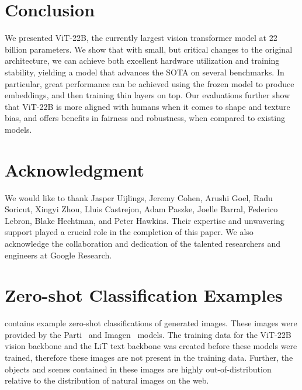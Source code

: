 \documentclass{article}
\newcommand{\chonk}{\mbox{ViT-22B}\xspace}
\begin{document}
\section{Conclusion}
\label{sec:conclusion}
We presented \chonk, the currently largest  vision transformer model at 22 billion parameters.
We show that with small, but critical changes to the original architecture, we can achieve both excellent hardware utilization and training stability, yielding a model that advances the SOTA on several benchmarks.
In particular, great performance can be achieved using the frozen model to produce embeddings, and then training thin layers on top.
Our evaluations further show that \chonk is more aligned with humans when it comes to shape and texture bias, and offers benefits in fairness and robustness, when compared to existing models.

\section*{Acknowledgment}
We would like to thank Jasper Uijlings, Jeremy Cohen, Arushi Goel, Radu Soricut, Xingyi Zhou, Lluis Castrejon, Adam Paszke, Joelle Barral, Federico Lebron, Blake Hechtman, and Peter Hawkins. Their expertise and unwavering support played a crucial role in the completion of this paper. We also acknowledge the collaboration and dedication of the talented researchers and engineers at Google Research.




\appendix
\onecolumn
\section{Zero-shot Classification Examples}
\label{app:lit}

 contains example zero-shot classifications of generated images.
These images were provided by the Parti~\citep{parti} and Imagen~\citep{imagen} models.
The training data for the ViT-22B vision backbone and the LiT text backbone was created before these models were trained, therefore these images are not present in the training data. 
Further, the objects and scenes contained in these images are highly out-of-distribution relative to the distribution of natural images on the web.
\end{document}
